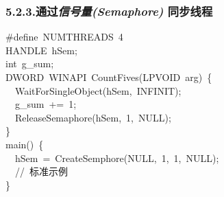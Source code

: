 \documentclass{article}
\begin{document}
\subsubsection{5.2.3.\hspace*{0.5em}通过\emph{信号量(Semaphore)} 同步线程}\label{sec--semaphore--}%
\begin{mdpre}%
\noindent\#define~{NUMTHREADS}~{4}\\
{HANDLE}~hSem;\\
{int}~g\_sum;\\
{DWORD}~{WINAPI}~{CountFives}({LPVOID}~arg)~\{\\
~~{WaitForSingleObject}(hSem,~{INFINIT});\\
~~g\_sum~+=~{1};\\
~~{ReleaseSemaphore}(hSem,~{1},~{NULL});\\
\}\\
main()~\{\\
~~hSem~=~{CreateSemphore}({NULL},~{1},~{1},~{NULL});\\
~~{//~标准示例}\\
\}%
\end{mdpre}
\end{document}
